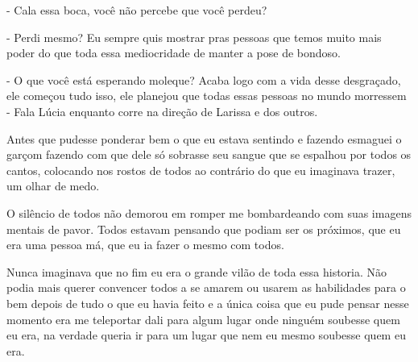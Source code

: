 - Cala essa boca, você não percebe que você perdeu?

- Perdi mesmo? Eu sempre quis mostrar pras pessoas que temos muito mais poder do que toda essa mediocridade de manter a pose de bondoso.

- O que você está esperando moleque? Acaba logo com a vida desse desgraçado, ele começou tudo isso, ele planejou que todas essas pessoas no mundo morressem - Fala Lúcia enquanto corre na direção de Larissa e dos outros.

Antes que pudesse ponderar bem o que eu estava sentindo e fazendo esmaguei o garçom fazendo com que dele só sobrasse seu sangue que se espalhou por todos os cantos, colocando nos rostos de todos ao contrário do que eu imaginava trazer, um olhar de medo.

O silêncio de todos não demorou em romper me bombardeando com suas imagens mentais de pavor. Todos estavam pensando que podiam ser os próximos, que eu era uma pessoa má, que eu ia fazer o mesmo com todos.

Nunca imaginava que no fim eu era o grande vilão de toda essa historia. Não podia mais querer convencer todos a se amarem ou usarem as habilidades para o bem depois de tudo o que eu havia feito e a única coisa que eu pude pensar nesse momento era me teleportar dali para algum lugar onde ninguém soubesse quem eu era, na verdade queria ir para um lugar que nem eu mesmo soubesse quem eu era.